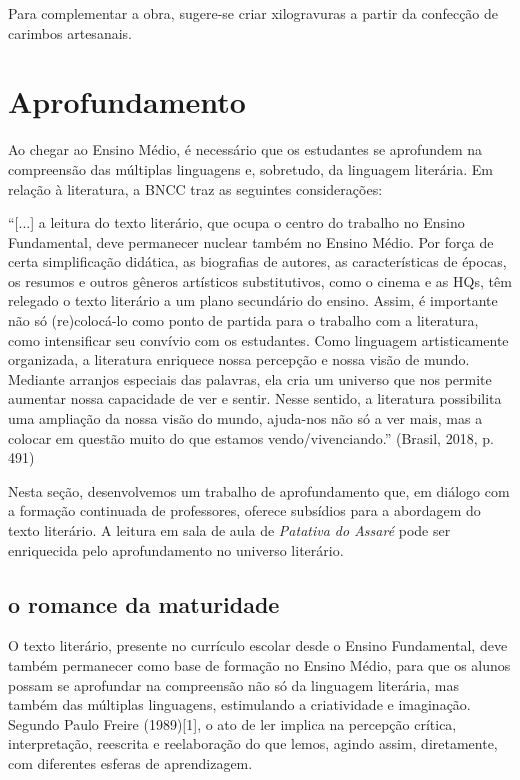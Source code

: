\documentclass[12pt]{extarticle}
\begin{document}
Para complementar a obra, sugere-se criar xilogravuras a partir da
confecção de carimbos artesanais.


\section{Aprofundamento}

Ao chegar ao Ensino Médio, é necessário que os estudantes se aprofundem
na compreensão das múltiplas linguagens e, sobretudo, da linguagem
literária. Em relação à literatura, a BNCC traz as seguintes
considerações:

``{[}...{]} a leitura do texto literário, que ocupa o centro do trabalho
no Ensino Fundamental, deve permanecer nuclear também no Ensino Médio.
Por força de certa simplificação didática, as biografias de autores, as
características de épocas, os resumos e outros gêneros artísticos
substitutivos, como o cinema e as HQs, têm relegado o texto literário a
um plano secundário do ensino. Assim, é importante não só (re)colocá-lo
como ponto de partida para o trabalho com a literatura, como
intensificar seu convívio com os estudantes. Como linguagem
artisticamente organizada, a literatura enriquece nossa percepção e
nossa visão de mundo. Mediante arranjos especiais das palavras, ela cria
um universo que nos permite aumentar nossa capacidade de ver e sentir.
Nesse sentido, a literatura possibilita uma ampliação da nossa visão do
mundo, ajuda-nos não só a ver mais, mas a colocar em questão muito do
que estamos vendo/vivenciando.'' (Brasil, 2018, p. 491)

Nesta seção, desenvolvemos um trabalho de aprofundamento que, em diálogo
com a formação continuada de professores, oferece subsídios para a
abordagem do texto literário. A leitura em sala de aula de
\emph{Patativa do Assaré} pode ser enriquecida pelo aprofundamento no
universo literário.

\subsection{o romance da maturidade}

O texto literário, presente no currículo escolar desde o Ensino
Fundamental, deve também permanecer como base de formação no Ensino
Médio, para que os alunos possam se aprofundar na compreensão não só da
linguagem literária, mas também das múltiplas linguagens, estimulando a
criatividade e imaginação. Segundo Paulo Freire (1989){[}1{]}, o ato de
ler implica na percepção crítica, interpretação, reescrita e
reelaboração do que lemos, agindo assim, diretamente, com diferentes
esferas de aprendizagem.
\end{document}
